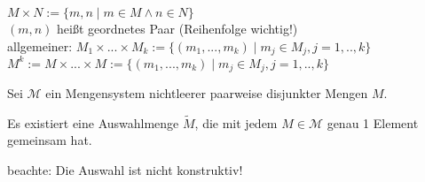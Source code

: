 \begin{mydef}
	$M \times N := \{m,n \mid m \in M \land n \in N\}$ \\
	$(m,n)$ hei{\ss}t geordnetes Paar (Reihenfolge wichtig!) \\
	allgemeiner: $M_1 \times ... \times M_k := \{(m_1,...,m_k) \mid m_j \in M_j, j=1, .., k\}$ \\
	$M^k := M \times ... \times M := \{(m_1,...,m_k) \mid m_j \in M_j, j=1, .., k\}$ 
\end{mydef}

\begin{satz}[Auswahlaxiom]
	Sei $\mathcal M$ ein Mengensystem nichtleerer paarweise disjunkter Mengen $M$.
	\begin{compactitem}
		\item Es existiert eine Auswahlmenge $\tilde M$, die mit jedem $M \in \mathcal M$ genau 1 Element 				gemeinsam hat.
		\item beachte: Die Auswahl ist nicht konstruktiv!
	\end{compactitem}
\end{satz}